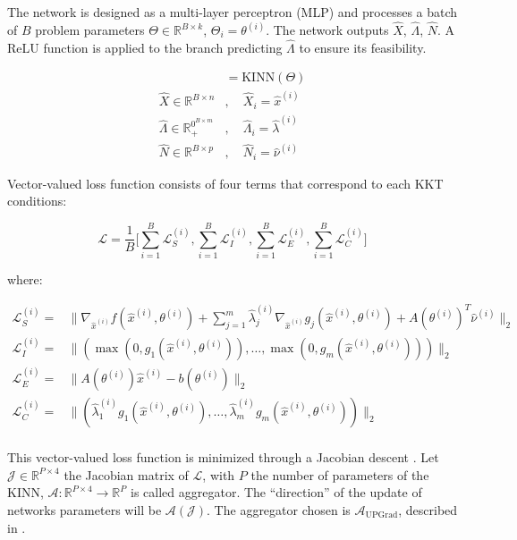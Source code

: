 \documentclass[
]{article}
\begin{document}
The network is designed as a multi-layer perceptron (MLP) and processes
a batch of \(B\) problem parameters
\(\Theta \in \mathbb{R}^{B \times k}\), \(\Theta_i = \theta^{(i)}\). The
network outputs \(\hat{X}\), \(\hat\Lambda\), \(\hat{N}\). A ReLU
function is applied to the branch predicting \(\hat\Lambda\) to ensure
its feasibility.

\begin{align}
[\hat{X}, \hat{\Lambda}, \hat{N}] &= \textrm{KINN}(\Theta)\\
\hat{X} \in \mathbb{R}^{B\times n}&, \quad \hat X_i = \hat{x}^{(i)}\\
\hat{\Lambda} \in \mathbb{R}^{0^{B\times m}}_+&, \quad \hat\Lambda_i = \hat\lambda^{(i)}\\
\hat{N} \in \mathbb{R}^{B\times p}&, \quad \hat{N}_i = \hat\nu^{(i)}
\end{align}

Vector-valued loss function consists of four terms that correspond to
each KKT conditions:

\begin{equation}
\mathcal{L} = \frac{1}{B}\biggr[\sum_{i=1}^B\mathcal{L}_{S}^{(i)}, \sum_{i=1}^B\mathcal{L}_{I}^{(i)}, \sum_{i=1}^B\mathcal{L}_{E}^{(i)}, \sum_{i=1}^B\mathcal{L}_{C}^{(i)}\biggr] 
\end{equation}

where:

\begin{align}
    \mathcal{L}_{S}^{(i)} =& \|\nabla_{\hat{x}^{(i)}} f(\hat{x}^{(i)}, \theta^{(i)}) + \sum\nolimits_{j=1}^m \hat{\lambda}^{(i)}_j\nabla_{\hat{x}^{(i)}} g_j(\hat{x}^{(i)}, \theta^{(i)}) + A(\theta^{(i)})^T\hat{\nu}^{(i)}\|_2\\ 
    \mathcal{L}_{I}^{(i)}  =& \|(\max(0, g_1(\hat{x}^{(i)}, \theta^{(i)})),\dots,\max(0, g_m(\hat{x}^{(i)}, \theta^{(i)})))\|_2\\
    \mathcal{L}_{E}^{(i)} =& \|A(\theta^{(i)}) \hat{x}^{(i)} - b(\theta^{(i)})\|_2\\
    \mathcal{L}_{C}^{(i)}  =& \|(\hat{\lambda}_1^{(i)} g_1(\hat{x}^{(i)}, \theta^{(i)}),\dots,\hat{\lambda}_m^{(i)} g_m(\hat{x}^{(i)}, \theta^{(i)}))\|_2\\
\end{align}

This vector-valued loss function is minimized through a Jacobian descent
\citep{quintonJacobianDescentMultiObjective2024a}. Let
\(\mathcal{J} \in \mathbb{R}^{P\times4}\) the Jacobian matrix of
\(\mathcal{L}\), with \(P\) the number of parameters of the KINN,
\(\mathcal{A}: \mathbb{R}^{P\times4} \to \mathbb{R}^{P}\) is called
aggregator. The ``direction'' of the update of networks parameters will
be \(\mathcal{A}(\mathcal{J})\). The aggregator chosen is
\(\mathcal{A}_{\mathrm{UPGrad}}\), described in
\citep{quintonJacobianDescentMultiObjective2024a}.
\end{document}
